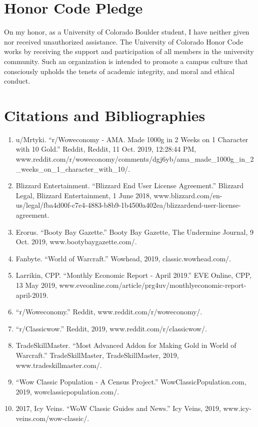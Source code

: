 \documentclass[sigconf]{acmart}
\begin{document}
\section{Honor Code Pledge}
On my honor, as a University of Colorado Boulder student, I have neither given nor received unauthorized assistance. The University of Colorado Honor Code works by receiving the support and participation of all members in the university community. Such an organization is intended to promote a campus culture that consciously upholds the tenets of academic integrity, and moral and ethical conduct.

\section{Citations and Bibliographies}
\begin{enumerate}
\item u/Mrtyki. “r/Woweconomy - AMA. Made 1000g in 2 Weeks on 1 Character with 10 Gold.” Reddit, Reddit, 11 Oct. 2019, 12:28:44 PM, www.reddit.com/r/woweconomy/comments/dgj6yb/ama\_made\_1000g\_in\_2\_weeks\_on\_1\_character\_with\_10/.
\item Blizzard Entertainment. “Blizzard End User License Agreement.” Blizzard Legal, Blizzard Entertainment, 1 June 2018, www.blizzard.com/en-us/legal/fba4d00f-c7e4-4883-b8b9-1b4500a402ea/blizzardend-user-license-agreement. 
\item Erorus. “Booty Bay Gazette.” Booty Bay Gazette, The Undermine Journal, 9 Oct. 2019, www.bootybaygazette.com/. 
\item Fanbyte. “World of Warcraft.” Wowhead, 2019, classic.wowhead.com/. 
\item Larrikin, CPP. “Monthly Economic Report - April 2019.” EVE Online, CPP, 13 May 2019, www.eveonline.com/article/prg4uv/monthlyeconomic-report-april-2019. 
\item “r/Woweconomy.” Reddit, www.reddit.com/r/woweconomy/. 
\item “r/Classicwow.” Reddit, 2019, www.reddit.com/r/classicwow/.
\item TradeSkillMaster. “Most Advanced Addon for Making Gold in World of Warcraft.” TradeSkillMaster, TradeSkillMaster, 2019, www.tradeskillmaster.com/.
\item “Wow Classic Population - A Census Project.” WowClassicPopulation.com, 2019, wowclassicpopulation.com/.
\item 2017, Icy Veins. “WoW Classic Guides and News.” Icy Veins, 2019, www.icy-veins.com/wow-classic/.

\end{enumerate}
\end{document}
